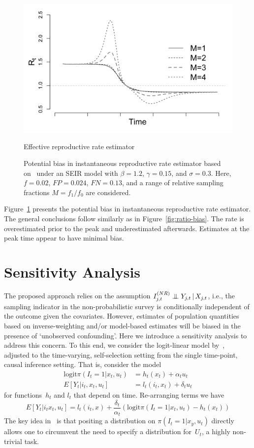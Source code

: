 \documentclass[12pt]{amsart}
\numberwithin{equation}{section}
\theoremstyle{plain}
\def\logit{\text{logit}}
\begin{document}
\begin{figure}
 \centering
  \includegraphics[width=.9\linewidth]{../figs/seir_cori_rt.png}
  \caption{Effective reproductive rate estimator}
 \caption{Potential bias in instantaneous reproductive rate estimator based on~\cite{Cori20113} under an SEIR model with $\beta = 1.2$, $\gamma = 0.15$, and $\sigma = 0.3$.  Here, $f = 0.02$, $FP = 0.024$, $FN = 0.13$, and a range of relative sampling fractions $M = f_1/f_0$ are considered.}
 \label{fig:cori-bias}
 \end{figure}


Figure~\ref{fig:cori-bias} presents the potential bias in instantaneous reproductive rate estimator.  The general conclusions follow similarly as in  Figure~\ref{fig:ratio-bias}. The rate is overestimated prior to the peak and underestimated afterwards.  Estimates at the peak time appear to have minimal bias.

\section{Sensitivity Analysis}

The proposed approach relies on the assumption $I_{j,t}^{(NR)} \indep Y_{j,t} \, | \, X_{j,t}$, i.e., the sampling indicator in the non-probabilistic survey is conditionally independent of the outcome given the covariates.  However, estimates of population quantities based on inverse-weighting and/or model-based estimates will be biased in the presence of `unobserved confounding'.  Here we introduce a sensitivity analysis to address this concern.  To this end, we consider the logit-linear model by~\cite{Imbens2003}, adjusted to the time-varying, self-selection setting from the single time-point, causal inference setting.  That is, consider the model
\begin{align*}
\logit \pi \left( I_{t} = 1  | x_{t}, u_{t} \right) &= h_t(x_t) + \alpha_t u_t \\
E[ Y_t | i_t, x_t, u_t] &= l_t(i_t, x_t) + \delta_t u_t
\end{align*}
for functions~$h_t$ and $l_t$ that depend on time. Re-arranging terms we have
$$
E[ Y_t | i_t x_t, u_t ] = l_t(i_t,x)  + \frac{\delta_t}{\alpha_t} \left( \logit \pi \left( I_{t} = 1  | x_{t}, u_{t} \right) - h_t (x_t) \right)
$$
The key idea in~\cite{Imbens2003} is that positing a distribution on $\pi(I_t = 1 | x_y, u_t)$ directly allows one to circumvent the need to specify a distribution for~$U_t$, a highly non-trivial task.
\end{document}

